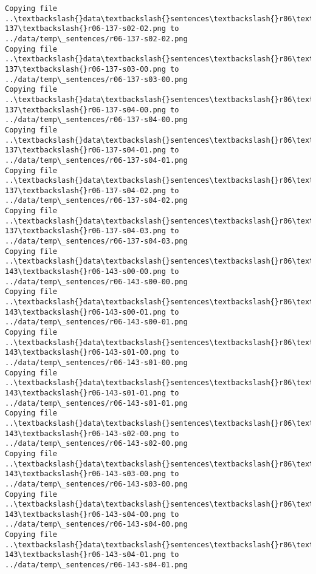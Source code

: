 \documentclass[11pt]{article}
\begin{document}
\begin{Verbatim}[commandchars=\\\{\}]
Copying file ..\textbackslash{}data\textbackslash{}sentences\textbackslash{}r06\textbackslash{}r06-137\textbackslash{}r06-137-s02-02.png to
../data/temp\_sentences/r06-137-s02-02.png
Copying file ..\textbackslash{}data\textbackslash{}sentences\textbackslash{}r06\textbackslash{}r06-137\textbackslash{}r06-137-s03-00.png to
../data/temp\_sentences/r06-137-s03-00.png
Copying file ..\textbackslash{}data\textbackslash{}sentences\textbackslash{}r06\textbackslash{}r06-137\textbackslash{}r06-137-s04-00.png to
../data/temp\_sentences/r06-137-s04-00.png
Copying file ..\textbackslash{}data\textbackslash{}sentences\textbackslash{}r06\textbackslash{}r06-137\textbackslash{}r06-137-s04-01.png to
../data/temp\_sentences/r06-137-s04-01.png
Copying file ..\textbackslash{}data\textbackslash{}sentences\textbackslash{}r06\textbackslash{}r06-137\textbackslash{}r06-137-s04-02.png to
../data/temp\_sentences/r06-137-s04-02.png
Copying file ..\textbackslash{}data\textbackslash{}sentences\textbackslash{}r06\textbackslash{}r06-137\textbackslash{}r06-137-s04-03.png to
../data/temp\_sentences/r06-137-s04-03.png
Copying file ..\textbackslash{}data\textbackslash{}sentences\textbackslash{}r06\textbackslash{}r06-143\textbackslash{}r06-143-s00-00.png to
../data/temp\_sentences/r06-143-s00-00.png
Copying file ..\textbackslash{}data\textbackslash{}sentences\textbackslash{}r06\textbackslash{}r06-143\textbackslash{}r06-143-s00-01.png to
../data/temp\_sentences/r06-143-s00-01.png
Copying file ..\textbackslash{}data\textbackslash{}sentences\textbackslash{}r06\textbackslash{}r06-143\textbackslash{}r06-143-s01-00.png to
../data/temp\_sentences/r06-143-s01-00.png
Copying file ..\textbackslash{}data\textbackslash{}sentences\textbackslash{}r06\textbackslash{}r06-143\textbackslash{}r06-143-s01-01.png to
../data/temp\_sentences/r06-143-s01-01.png
Copying file ..\textbackslash{}data\textbackslash{}sentences\textbackslash{}r06\textbackslash{}r06-143\textbackslash{}r06-143-s02-00.png to
../data/temp\_sentences/r06-143-s02-00.png
Copying file ..\textbackslash{}data\textbackslash{}sentences\textbackslash{}r06\textbackslash{}r06-143\textbackslash{}r06-143-s03-00.png to
../data/temp\_sentences/r06-143-s03-00.png
Copying file ..\textbackslash{}data\textbackslash{}sentences\textbackslash{}r06\textbackslash{}r06-143\textbackslash{}r06-143-s04-00.png to
../data/temp\_sentences/r06-143-s04-00.png
Copying file ..\textbackslash{}data\textbackslash{}sentences\textbackslash{}r06\textbackslash{}r06-143\textbackslash{}r06-143-s04-01.png to
../data/temp\_sentences/r06-143-s04-01.png
    \end{Verbatim}
\end{document}

